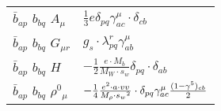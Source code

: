 \begin{center}
\begin{tabular}{|l|l|}
$\bar{b}{}_{a p }$ \phantom{-} $b{}_{b q }$ \phantom{-} ${A}_{\mu }$ \phantom{-}  &
	$\frac{1}{3} e\delta_{p q} \gamma_{a c}^\mu \cdot \delta_{c b} $\\[2mm]
$\bar{b}{}_{a p }$ \phantom{-} $b{}_{b q }$ \phantom{-} ${G}_{\mu r }$ \phantom{-}  &
	$ g_s\cdot \lambda_{p q}^r \gamma_{a b}^\mu $\\[2mm]
$\bar{b}{}_{a p }$ \phantom{-} $b{}_{b q }$ \phantom{-} ${H}_{}$ \phantom{-}  &
	$-\frac{1}{2}\frac{ e \cdot M_b}{ M_W \cdot s_w}\delta_{p q} \cdot \delta_{a b} $\\[2mm]
$\bar{b}{}_{a p }$ \phantom{-} $b{}_{b q }$ \phantom{-} $\rho^0{}_{\mu }$ \phantom{-}  &
	$-\frac{1}{4}\frac{ e{}^2  \cdot a \cdot vv}{ M_{\rho} \cdot s_w{}^2 }\cdot \delta_{p q} \gamma_{a c}^\mu {(1-\gamma^5)_{c b}\over 2} $\\ \hline
\end{tabular}


\end{center}
